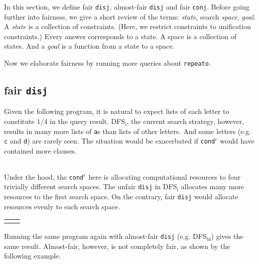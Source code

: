 \documentclass[format=acmlarge, review=true, authordraft=true]{acmart}
\newcommand{\conde}{\texttt{cond$^e$}}
\newcommand{\conj}{\texttt{conj}}
\newcommand{\disj}{\texttt{disj}}
\newcommand{\DFSi }[0]{DFS$_\textrm{i}$}
\newcommand{\DFSbi}[0]{DFS$_\textrm{bi}$}
\begin{document}
In this section, we define fair \disj{}, almost-fair \disj{} and fair \conj{}. 
Before going further into fairness, we give a short review of the terms:
\emph{state}, search \emph{space}, \emph{goal}.
A \emph{state} is a collection of constraints. (Here, we restrict 
constraints to unification constraints.) Every answer corresponds to a 
state. A space is a collection of states. And a \emph{goal} is a 
function from a state to a space.


Now we elaborate fairness by running more queries about \texttt{repeato}.

\subsection{fair \texttt{disj}}

Given the following program, it is natural to expect lists of each letter to
constitute $1/4$ in the query result. \DFSi, the current search
strategy, however, results in many more lists of \texttt{a}s than lists
of other letters. And some letters  (e.g. \texttt{c} and \texttt{d}) are
rarely seen. The situation would be exacerbated if \conde{} would have
contained more clauses.

\begin{center}
	\begin{tabular}{c}
		
	\end{tabular}
\end{center}

Under the hood, the \conde{} here is allocating computational resources to 
four trivially different search spaces. The unfair \disj{} in 
\DFSi{} allocates many more resources to the first search space. On the 
contrary, fair \disj{} would allocate resources evenly to each search space. 

\begin{center}
	\begin{tabular}{l|r}
		 &
		
	\end{tabular}
\end{center}

Running the same program again with almost-fair \disj {} (e.g. 
\DFSbi{}) gives the same result. Almost-fair, however, is not 
completely fair, as shown by the following example. 
\end{document}
